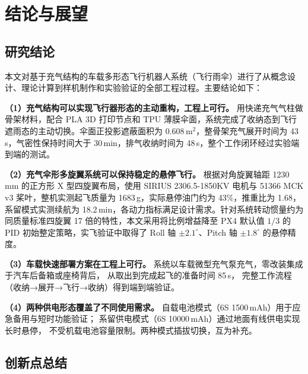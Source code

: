 \chapter{结论与展望}

\section{研究结论}

本文对基于充气结构的车载多形态飞行机器人系统（飞行雨伞）进行了从概念设计、理论计算到样机制作和实验验证的全部工程过程。主要结论如下：

\textbf{（1）充气结构可以实现飞行器形态的主动重构，工程上可行。}
用快递充气气柱做骨架材料，配合 PLA 3D 打印节点和 TPU 薄膜伞面，系统完成了收纳态到飞行遮雨态的主动切换。伞面正投影遮蔽面积为 $0.608\,\text{m}^2$，整骨架充气展开时间为 43\,s，气密性保持时间大于 30\,min，排气收纳时间为 48\,s，整个工作闭环经过实验端到端的测试。

\textbf{（2）充气伞形多旋翼系统可以保持稳定的悬停飞行。}
根据对角旋翼轴距 1230\,mm 的正方形 X 型四旋翼布局，使用 SIRIUS 2306.5-1850KV 电机与 51366 MCK v3 桨叶，整机实测起飞质量为 1683\,g，实际悬停油门约为 43\%，推重比为 1.68，系留模式实测续航为 18.2\,min，各动力指标满足设计需求。针对系统转动惯量约为同质量标准四旋翼 17 倍的特性，本文采用将比例增益降至 PX4 默认值 $1/3$ 的 PID 初始整定策略，实飞验证中取得了 Roll 轴 $\pm2.1^\circ$、Pitch 轴 $\pm1.8^\circ$ 的悬停精度。

\textbf{（3）车载快速部署方案在工程上可行。}
系统以车载微型充气泵充气，零改装集成于汽车后备箱或座椅背后，
从取出到完成起飞的准备时间 85\,s，
完整工作流程（收纳→展开→飞行→收纳）得到端到端验证。

\textbf{（4）两种供电形态覆盖了不同使用需求。}
自载电池模式（6S 1500\,mAh）用于应急备用与短时功能验证；
系留供电模式（6S 10000\,mAh）通过地面有线供电实现长时悬停，
不受机载电池容量限制。两种模式插拔切换，互为补充。


\section{创新点总结}

